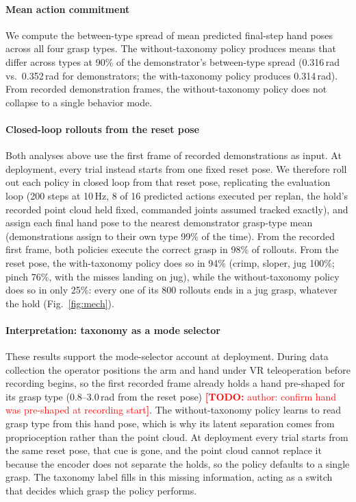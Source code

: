 \documentclass[letterpaper, 10pt, journal, twoside]{IEEEtran}
\newcommand{\todo}[1]{\textcolor{red}{\textbf{[TODO:} #1\textbf{]}}}
\begin{document}
\paragraph*{Mean action commitment}
We compute the between-type spread of mean predicted final-step hand poses across all
four grasp types. The without-taxonomy policy produces means that differ across
types at 90\% of the demonstrator's between-type spread (0.316\,rad vs.\ 0.352\,rad
for demonstrators; the with-taxonomy policy produces 0.314\,rad). From recorded
demonstration frames, the without-taxonomy
policy does not collapse to a single behavior mode.

\paragraph*{Closed-loop rollouts from the reset pose}
Both analyses above use the first frame of recorded demonstrations as input. At
deployment, every trial instead starts from one fixed reset pose. We therefore roll
out each policy in closed loop from that reset pose, replicating the evaluation loop
(200 steps at 10\,Hz, 8 of 16 predicted actions executed per replan, the hold's
recorded point cloud held fixed, commanded joints assumed tracked exactly), and assign
each final hand pose to the nearest demonstrator grasp-type mean (demonstrations
assign to their own type 99\% of the time). From the recorded first frame, both
policies execute the correct grasp in 98\% of rollouts. From the reset pose, the
with-taxonomy policy does so in 94\% (crimp, sloper, jug 100\%; pinch 76\%, with the
misses landing on jug), while the without-taxonomy policy does so in only 25\%: every
one of its 800 rollouts ends in a jug grasp, whatever the hold (Fig.~\ref{fig:mech}).

\paragraph*{Interpretation: taxonomy as a mode selector}
These results support the mode-selector account at deployment. During data
collection the operator positions the arm and hand under VR teleoperation before
recording begins, so the first recorded frame already holds a hand pre-shaped for its
grasp type (0.8--3.0\,rad from the reset pose) \todo{author: confirm hand was
pre-shaped at recording start}. The without-taxonomy policy learns to read grasp type from
this hand pose, which is why its latent separation comes from proprioception rather
than the point cloud. At deployment every trial starts from the same reset pose, that
cue is gone, and the point cloud cannot replace it because the encoder does not
separate the holds, so the policy defaults to a single grasp. The taxonomy label fills
in this missing information, acting as a switch that decides which grasp the policy
performs.
\end{document}
